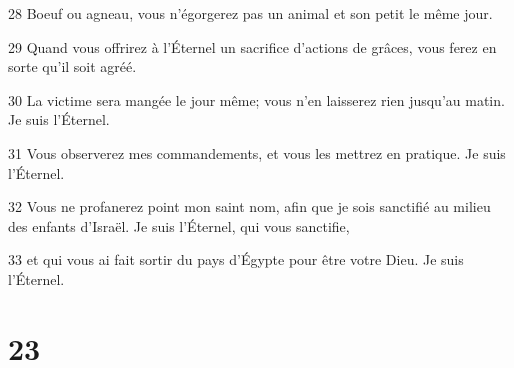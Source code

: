 \par 28 Boeuf ou agneau, vous n'égorgerez pas un animal et son petit le même jour.
\par 29 Quand vous offrirez à l'Éternel un sacrifice d'actions de grâces, vous ferez en sorte qu'il soit agréé.
\par 30 La victime sera mangée le jour même; vous n'en laisserez rien jusqu'au matin. Je suis l'Éternel.
\par 31 Vous observerez mes commandements, et vous les mettrez en pratique. Je suis l'Éternel.
\par 32 Vous ne profanerez point mon saint nom, afin que je sois sanctifié au milieu des enfants d'Israël. Je suis l'Éternel, qui vous sanctifie,
\par 33 et qui vous ai fait sortir du pays d'Égypte pour être votre Dieu. Je suis l'Éternel.

\chapter{23}

